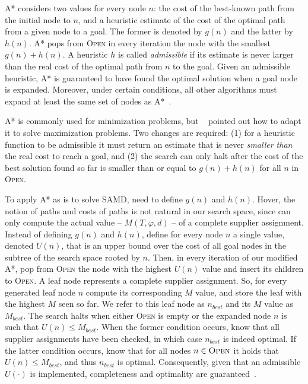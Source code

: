 \documentclass[letterpaper]{article} %
\newcommand{\samd}{\ac{SAMD}\xspace}
\newcommand{\astar}{\textsc{A*}\xspace}
\newcommand{\open}{\textsc{Open}\xspace}
\begin{document}
\astar considers two values for every node $n$:
the cost of the best-known path from the initial node to $n$,
and a heuristic estimate of the cost of the optimal path from a given node to a goal.
The former is denoted by $g(n)$ and the latter by $h(n)$. \astar pops from \open in every iteration the
node with the smallest $g(n)+h(n)$.
A heuristic $h$ is called \emph{admissible} if its estimate is never larger than the real cost of the optimal path from $n$ to the goal.
Given an admissible heuristic, \astar is guaranteed to have found the optimal solution when a goal node is expanded. Moreover, under certain conditions, all other algorithms must expand at least the same set of nodes as \astar~\cite{dechter1985generalized,holte2019OnThe}.


\astar is commonly used for minimization problems, but ~\cite{stern2014max} pointed out how to adapt it to solve maximization problems. Two changes are required: (1) for a heuristic function to be admissible it must return an estimate that is never \emph{smaller than} the real cost to reach a goal,
and (2) the search can only halt after the cost of the best solution found so far
is smaller than or equal to $g(n)+h(n)$ for all $n$ in \open.

To apply \astar as is to solve \samd,  need to define $g(n)$ and $h(n)$. Hover,
the notion of paths and costs of paths is not natural in our search space,
since  can only compute the actual value -- $M(T, \varphi,d)$ -- of a complete supplier assignment.
Instead of defining $g(n)$ and $h(n)$,  define for every node $n$ a single value, denoted $U(n)$,
that is an upper bound over the cost of all goal nodes in the subtree of the search space rooted by $n$.
Then, in every iteration of our modified \astar,  pop from \open the node with the highest $U(n)$ value
and insert its children to \open.
A leaf node represents a complete supplier assignment. So, for every generated leaf node $n$  compute its corresponding $M$ value, and store the leaf with the highest $M$ seen so far. We refer to this leaf node as $n_{best}$ and its $M$ value as $M_{best}$.  The search halts when either \open is empty or the expanded node $n$ is such that $U(n)\leq M_{best}$. When the former condition occurs,  know that all supplier assignments have been checked, in which case $n_{best}$ is indeed optimal. If the latter condition occurs,  know that for all nodes $n\in \open$ it holds that $U(n)\leq M_{best}$, and thus $n_{best}$ is optimal. Consequently, given that an admissible $U(\cdot)$ is implemented, completeness and optimality are guaranteed~\cite{stern2014max,holte2019OnThe}.
\end{document}
